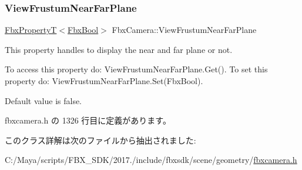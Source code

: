 \subsubsection{\texorpdfstring{View\+Frustum\+Near\+Far\+Plane}{ViewFrustumNearFarPlane}}
{\footnotesize\ttfamily \hyperlink{class_fbx_property_t}{Fbx\+PropertyT}$<$\hyperlink{fbxtypes_8h_a92e0562b2fe33e76a242f498b362262e}{Fbx\+Bool}$>$ Fbx\+Camera\+::\+View\+Frustum\+Near\+Far\+Plane}

This property handles to display the near and far plane or not.

To access this property do\+: View\+Frustum\+Near\+Far\+Plane.\+Get(). To set this property do\+: View\+Frustum\+Near\+Far\+Plane.\+Set(\+Fbx\+Bool).

Default value is false. 

 fbxcamera.\+h の 1326 行目に定義があります。



このクラス詳解は次のファイルから抽出されました\+:\begin{DoxyCompactItemize}
\item 
C\+:/\+Maya/scripts/\+F\+B\+X\+\_\+\+S\+D\+K/2017./include/fbxsdk/scene/geometry/\hyperlink{fbxcamera_8h}{fbxcamera.\+h}\end{DoxyCompactItemize}
